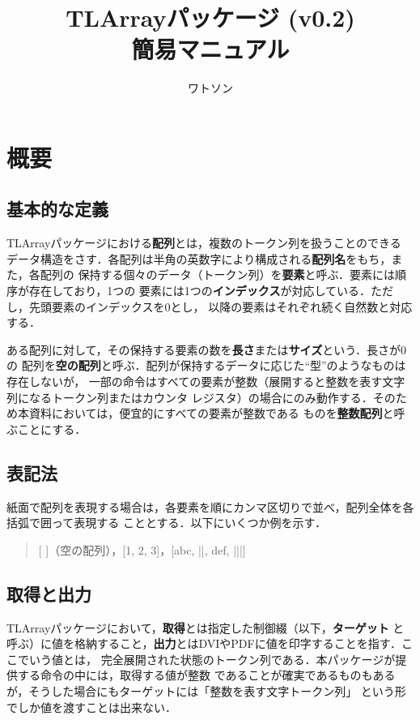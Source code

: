 \documentclass[a4paper,uplatex]{jsarticle}
\title{\textsf{TLArray}パッケージ (v0.2) \\ 簡易マニュアル}
\author{ワトソン}
\begin{document}
\maketitle

\section{概要}

\subsection{基本的な定義}

\textsf{TLArray}パッケージにおける\textbf{配列}とは，複数のトークン列を扱うことのできる
データ構造をさす．各配列は半角の英数字により構成される\textbf{配列名}をもち，また，各配列の
保持する個々のデータ（トークン列）を\textbf{要素}と呼ぶ．要素には順序が存在しており，1つの
要素には1つの\textbf{インデックス}が対応している．ただし，先頭要素のインデックスを0とし，
以降の要素はそれぞれ続く自然数と対応する．

ある配列に対して，その保持する要素の数を\textbf{長さ}または\textbf{サイズ}という．長さが0の
配列を\textbf{空の配列}と呼ぶ．配列が保持するデータに応じた``型''のようなものは存在しないが，
一部の命令はすべての要素が整数（展開すると整数を表す文字列になるトークン列またはカウンタ
レジスタ）の場合にのみ動作する．そのため本資料においては，便宜的にすべての要素が整数である
ものを\textbf{整数配列}と呼ぶことにする．

\subsection{表記法}

紙面で配列を表現する場合は，各要素を順にカンマ区切りで並べ，配列全体を各括弧で囲って表現する
こととする．以下にいくつか例を示す．
%
\begin{quote}
[ ]（空の配列），[1, 2, 3]，[abc, |\foo|, def, |\bar|]
\end{quote}

\subsection{取得と出力}

\textsf{TLArray}パッケージにおいて，\textbf{取得}とは指定した制御綴（以下，\textbf{ターゲット}
と呼ぶ）に値を格納すること，\textbf{出力}とはDVIやPDFに値を印字することを指す．ここでいう値とは，
完全展開された状態のトークン列である．本パッケージが提供する命令の中には，取得する値が整数
であることが確実であるものもあるが，そうした場合にもターゲットには「整数を表す文字トークン列」
という形でしか値を渡すことは出来ない．
\end{document}
